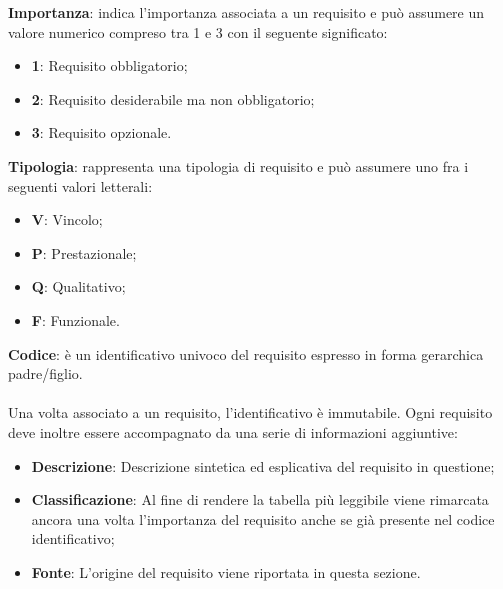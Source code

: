             \textbf{Importanza}: indica l'importanza associata a un requisito e può assumere un valore numerico compreso tra 1 e 3 con il seguente significato:
                \begin{itemize}[label={}]
                    \item \textbf{1}: Requisito obbligatorio;
                    \item \textbf{2}: Requisito desiderabile ma non obbligatorio;
                    \item \textbf{3}: Requisito opzionale.
                \end{itemize}

            \textbf{Tipologia}: rappresenta una tipologia di requisito e può assumere uno fra i seguenti valori letterali:
            \begin{itemize}[label={}]
                \item \textbf{V}: Vincolo;
                \item \textbf{P}: Prestazionale;
                \item \textbf{Q}: Qualitativo;
                \item \textbf{F}: Funzionale.
            \end{itemize}

            \textbf{Codice}: è un identificativo univoco del requisito espresso in forma gerarchica padre/figlio.
            \\
            \\
            Una volta associato a un requisito, l'identificativo è immutabile.
            Ogni requisito deve inoltre essere accompagnato da una serie di informazioni aggiuntive:
            \begin{itemize}
                \item \textbf{Descrizione}: Descrizione sintetica ed esplicativa del requisito in questione;
                \item \textbf{Classificazione}: Al fine di rendere la tabella più leggibile viene rimarcata ancora una volta l'importanza del requisito anche se già presente nel codice identificativo;
                \item \textbf{Fonte}: L'origine del requisito viene riportata in questa sezione.
            \end{itemize}
            
